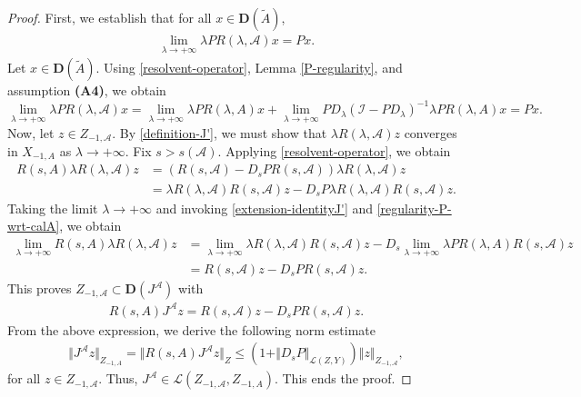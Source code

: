 \documentclass[10pt,a4paper]{amsart}
\def\calA{{\mathcal{A}}}
\def\calL{{\mathcal{L}}}
\def\la{\lambda}
\begin{document}
	\begin{proof}
		First, we establish that for all $x\in {\bm D}(\tilde{A})$,
		\begin{align}\label{regularity-P-wrt-calA}
			\lim_{\la \to +\infty}\la PR(\la,\calA)x=Px.
		\end{align}
		Let $x\in {\bm D}(\tilde{A})$. Using \eqref{resolvent-operator},  Lemma \ref{P-regularity}, and assumption {\bf (A4)}, we obtain
		\begin{equation*}
			\lim_{\la \to +\infty}\la PR(\la,\calA)x =\lim_{\la \to +\infty}\la PR(\la,A)x+\lim_{\la \to +\infty}  PD_\la (\mathcal{I}-PD_\la )^{-1}\la PR(\la,A)x
			=Px.
		\end{equation*}
		Now, let $z\in Z_{-1,\calA}$. By \eqref{definition-J'}, we must show that $\la R(\la,\calA)z$ converges in $X_{-1,A}$ as $\la \to +\infty$. Fix $ s>s(\calA)$. Applying \eqref{resolvent-operator}, we obtain
		\begin{align*}
			R(s,A)\la R(\la,\calA)z&=(R(s,\calA)-D_s PR(s,\calA))\la R(\la,\calA) z\\
			&=\la R(\la,\calA) R(s,\calA)z-D_s P\la R(\la,\calA)R(s,\calA)z.
		\end{align*}
		Taking the limit $\lambda \to +\infty$ and invoking \eqref{extension-identityJ'} and \eqref{regularity-P-wrt-calA}, we obtain
		\begin{align*}
			\lim_{\la \to +\infty}R(s,A)\la R(\la,\calA)z&=\lim_{\la \to +\infty}\la R(\la,\calA) R(s,\calA)z-D_s \lim_{\la \to +\infty}\la P R(\la,A)R(s,\calA)z\\
			&=R(s,\calA)z-D_s PR(s,\calA)z.
		\end{align*}
		This proves $Z_{-1,\calA}\subset {\bm D}(J^\calA)$  with
		\begin{align*}
			R(s,A)J^\calA z=R(s,\calA)z-D_s PR(s,\calA)z.
		\end{align*}
		From the above expression, we derive the following norm estimate
		\begin{align*}
			\Vert J^\calA z\Vert_{Z_{-1,A}}=\Vert R(s, A)J^\calA z\Vert_{Z}
			\le \left(1+\Vert D_s P\Vert_{\calL(Z,Y)}\right)\Vert z\Vert_{Z_{-1,\calA}},
		\end{align*}
		for all $z\in Z_{-1,\calA}$. Thus, $J^\calA \in \calL(Z_{-1,\calA},Z_{-1,A})$. This ends the proof.
	\end{proof}
\end{document}
